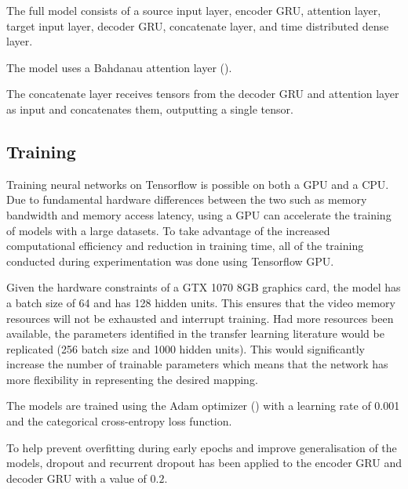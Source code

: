 The full model consists of a source input layer, encoder \acrshort{GRU}, attention layer, target input layer, decoder \acrshort{GRU}, concatenate layer, and time distributed dense layer.





The model uses a Bahdanau attention layer (\cite{bahdanau_neural_2016}).


The concatenate layer receives tensors from the decoder \acrshort{GRU} and attention layer as input and concatenates them, outputting a single tensor.






\subsection{Training}
Training neural networks on Tensorflow is possible on both a GPU and a CPU. Due to fundamental hardware differences between the two such as memory bandwidth and memory access latency, using a GPU can accelerate the training of models with a large datasets. To take advantage of the increased computational efficiency and reduction in training time, all of the training conducted during experimentation was done using Tensorflow GPU.

Given the hardware constraints of a GTX 1070 8GB graphics card, the model has a batch size of 64 and has 128 hidden units. This ensures that the video memory resources will not be exhausted and interrupt training. Had more resources been available, the parameters identified in the transfer learning literature would be replicated (256 batch size and 1000 hidden units). This would significantly increase the number of trainable parameters which means that the network has more flexibility in representing the desired mapping.

The models are trained using the Adam optimizer (\cite{adam_optimizer_2014}) with a learning rate of 0.001 and the categorical cross-entropy loss function.

To help prevent overfitting during early epochs and improve generalisation of the models, dropout and recurrent dropout has been applied to the encoder \acrshort{GRU} and decoder \acrshort{GRU} with a value of $0.2$.




